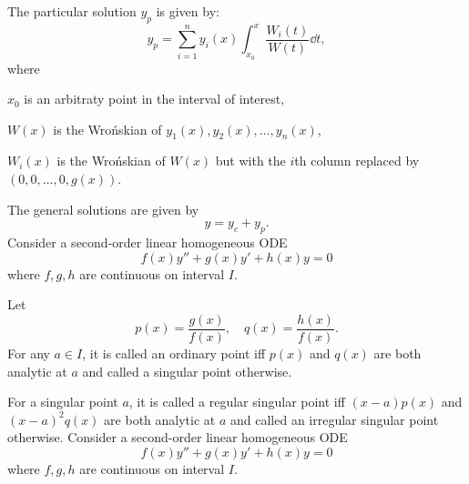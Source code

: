 \documentclass[a4paper,12pt]{report}
\begin{document}
The particular solution $y_p$ is given by:
\[y_p=\sum_{i=1}^ny_i(x)\int_{x_0}^x\frac{W_i(t)}{W(t)}\dd{t},\]
where
\bit
\item $x_0$ is an arbitraty point in the interval of interest,
\item $W(x)$ is the Wrońskian of $y_1(x),y_2(x),\ldots,y_n(x)$,
\item $W_i(x)$ is the Wrońskian of $W(x)$ but with the $i$th column replaced by $(0,0,\ldots,0,g(x))$.
\eit
\item The general solutions are given by
\[y=y_c+y_p.\]
\een
{}
Consider a second-order linear homogeneous ODE
\[f(x)y''+g(x)y'+h(x)y=0\]
where $f,g,h$ are continuous on interval $I$.

Let
\[p(x)=\frac{g(x)}{f(x)},\quad q(x)=\frac{h(x)}{f(x)}.\]
For any $a\in I$, it is called an ordinary point iff $p(x)$ and $q(x)$ are both analytic at $a$ and called a singular point otherwise.

For a singular point $a$, it is called a regular singular point iff $(x-a)p(x)$ and $(x-a)^2q(x)$ are both analytic at $a$ and called an irregular singular point otherwise.
Consider a second-order linear homogeneous ODE
\[f(x)y''+g(x)y'+h(x)y=0\]
where $f,g,h$ are continuous on interval $I$.
\end{document}
